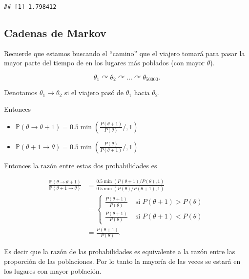 \documentclass[
  12pt,
]{book}
\providecommand{\tightlist}{%
  \setlength{\itemsep}{0pt}\setlength{\parskip}{0pt}}
\theoremstyle{definition}
\theoremstyle{definition}
\theoremstyle{definition}
\theoremstyle{remark}
\begin{document}
\begin{verbatim}
## [1] 1.798412
\end{verbatim}

\hypertarget{cadenas-de-markov}{%
\subsection{Cadenas de Markov}\label{cadenas-de-markov}}

Recuerde que estamos buscando el ``camino'' que el viajero tomará para pasar la mayor parte del tiempo de en los lugares más poblados (con mayor \(\theta\)).

\begin{equation*}
\theta_{1} \curvearrowright \theta_{2} \curvearrowright \ldots \curvearrowright \theta_{50000}.
\end{equation*}

Denotamos \(\theta_{1}\to\theta_{2}\) si el viajero pasó de \(\theta_{1}\) hacia \(\theta_{2}\).

Entonces

\begin{itemize}
\tightlist
\item
  \(\mathbb{P}\left(\theta \rightarrow \theta+1\right)=0.5 \min \left(\frac{P(\theta+1)}{P(\theta)} / , 1\right)\)
\item
  \(\mathbb{P}\left(\theta + 1 \rightarrow \theta\right)=0.5 \min \left(\frac{P(\theta)}{P(\theta+1)} / , 1\right)\)
\end{itemize}

Entonces la razón entre estas dos probabilidades es

\begin{align*}
    \frac{\mathbb{P}\left(\theta \rightarrow \theta+1\right)}{\mathbb{P}\left(\theta +1 \rightarrow \theta\right)}
      & =\frac{0.5 \min (P(\theta+1) / P(\theta), 1)}{0.5 \min (P(\theta) / P(\theta+1), 1)} \\
      & =\left\{\begin{array}{ll}
        \frac{P(\theta+1)}{P(\theta) }
          & \text { si } P(\theta+1)>P(\theta) \\
        \frac{P(\theta+1) }{P(\theta)}
          & \text { si } P(\theta+1)<P(\theta)
    \end{array}\right.                                             \\
    \, & =\frac{P(\theta+1)}{P(\theta)}.
\end{align*}

Es decir que la razón de las probabilidades es equivalente a la razón entre las proporción de las poblaciones. Por lo tanto la mayoría de las veces se estará en los lugares con mayor población.
\end{document}
